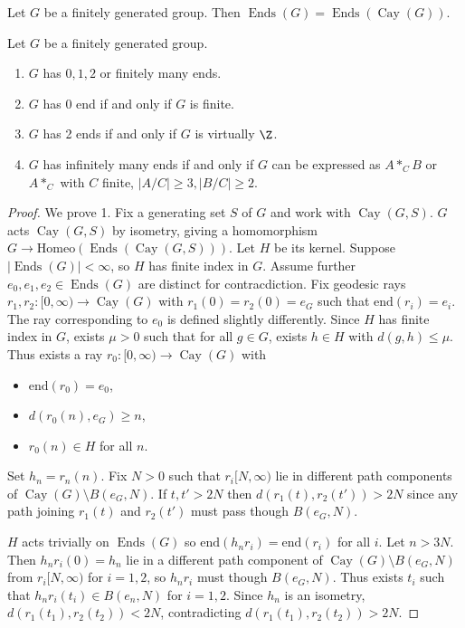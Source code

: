 \documentclass[a4paper]{article}
\DeclareMathOperator{\Cay}{Cay} %
\DeclareMathOperator{\Ends}{Ends} %
\begin{document}
\begin{definition}
  Let \(G\) be a finitely generated group. Then \(\Ends(G) = \Ends(\Cay(G))\).
\end{definition}

\begin{theorem}
  Let \(G\) be a finitely generated group.
  \begin{enumerate}
  \item \(G\) has \(0, 1, 2\) or finitely many ends.
  \item \(G\) has 0 end if and only if \(G\) is finite.
  \item \(G\) has 2 ends if and only if \(G\) is virtually \(\Z\).
  \item \(G\) has infinitely many ends if and only if \(G\) can be expressed as \(A *_C B\) or \(A *_C\) with \(C\) finite, \(|A/C| \geq 3, |B/C| \geq 2\).
  \end{enumerate}
\end{theorem}

\begin{proof}
  We prove 1. Fix a generating set \(S\) of \(G\) and work with \(\Cay(G, S)\). \(G\) acts \(\Cay(G, S)\) by isometry, giving a homomorphism \(G \to \mathrm{Homeo}(\Ends(\Cay(G, S)))\). Let \(H\) be its kernel. Suppose \(|\Ends(G)| < \infty\), so \(H\) has finite index in \(G\). Assume further \(e_0, e_1, e_2 \in \Ends(G)\) are distinct for contracdiction. Fix geodesic rays \(r_1, r_2: [0, \infty) \to \Cay(G)\) with \(r_1(0) = r_2(0) = e_G\) such that \(\mathrm{end}(r_i) = e_i\). The ray corresponding to \(e_0\) is defined  slightly differently. Since \(H\) has finite index in \(G\), exists \(\mu > 0\) such that for all \(g \in G\), exists \(h \in H\) with \(d(g, h) \leq \mu\). Thus exists a ray \(r_0: [0, \infty) \to \Cay(G)\) with
  \begin{itemize}
  \item \(\mathrm{end}(r_0) = e_0\),
  \item \(d(r_0(n), e_G) \geq n\),
  \item \(r_0(n) \in H\) for all \(n\).
  \end{itemize}
  Set \(h_n = r_n(n)\). Fix \(N > 0\) such that \(r_i[N, \infty)\) lie in different path components of \(\Cay(G) \setminus B(e_G, N)\). If \(t, t' > 2N\) then \(d(r_1(t), r_2(t')) > 2N\) since any path joining \(r_1(t)\) and \(r_2(t')\) must pass though \(B(e_G, N)\).

  \(H\) acts trivially on \(\Ends(G)\) so \(\mathrm{end}(h_n r_i) = \mathrm{end}(r_i)\) for all \(i\). Let \(n > 3N\). Then \(h_nr_i(0) = h_n\) lie in a different path component of \(\Cay(G) \setminus B(e_G, N)\) from \(r_i[N, \infty)\) for \(i = 1, 2\), so \(h_nr_i\) must though \(B(e_G, N)\). Thus exists \(t_i\) such that \(h_nr_i(t_i) \in B(e_n, N)\) for \(i = 1, 2\). Since \(h_n\) is an isometry, \(d(r_1(t_1), r_2(t_2)) < 2N\), contradicting \(d(r_1(t_1), r_2(t_2)) > 2N\).
\end{proof}
\end{document}
